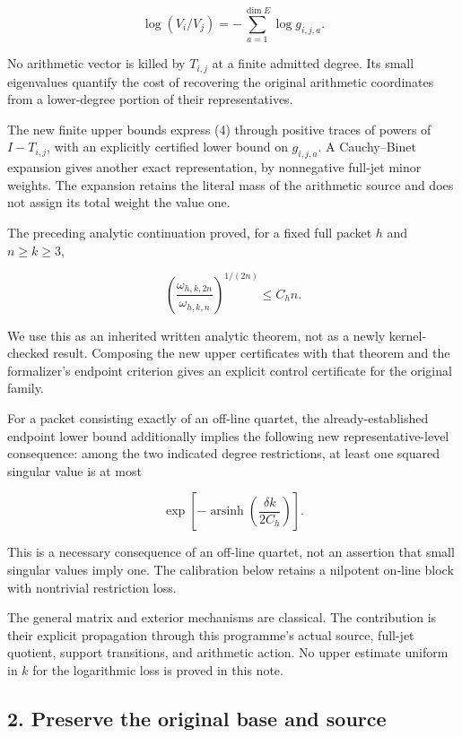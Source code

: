 \[
 \boxed{\log(V_i/V_j)=-\sum_{a=1}^{\dim E}\log g_{i,j,a}.}       \tag{4}
\]

No arithmetic vector is killed by \(T_{i,j}\) at a finite admitted degree. Its small eigenvalues quantify the cost of recovering the original arithmetic coordinates from a lower-degree portion of their representatives.

The new finite upper bounds express (4) through positive traces of powers of \(I-T_{i,j}\), with an explicitly certified lower bound on \(g_{i,j,a}\). A Cauchy--Binet expansion gives another exact representation, by nonnegative full-jet minor weights. The expansion retains the literal mass of the arithmetic source and does not assign its total weight the value one.

The preceding analytic continuation proved, for a fixed full packet \(h\) and \(n\ge k\ge3\),

\[
 \left(\frac{\omega_{h,k,2n}}{\omega_{h,k,n}}\right)^{1/(2n)}
 \le C_h n.                                                     \tag{5}
\]

We use this as an inherited written analytic theorem, not as a newly kernel-checked result. Composing the new upper certificates with that theorem and the formalizer's endpoint criterion gives an explicit control certificate for the original family.

For a packet consisting exactly of an off-line quartet, the already-established endpoint lower bound additionally implies the following new representative-level consequence: among the two indicated degree restrictions, at least one squared singular value is at most

\[
 \boxed{\exp\!\left[-\operatorname{arsinh}
                \left(\frac{\delta k}{2C_h}\right)\right].}       \tag{6}
\]

This is a necessary consequence of an off-line quartet, not an assertion that small singular values imply one. The calibration below retains a nilpotent on-line block with nontrivial restriction loss.

The general matrix and exterior mechanisms are classical. The contribution is their explicit propagation through this programme's actual source, full-jet quotient, support transitions, and arithmetic action. No upper estimate uniform in \(k\) for the logarithmic loss is proved in this note.

\subsection{2. Preserve the original base and source}\label{endpoint-restriction_original--preserve-the-original-base-and-source}

